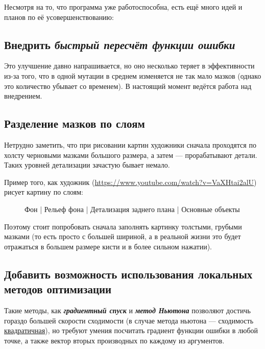 Несмотря на то, что программа уже работоспособна, есть ещё много идей и планов по её усовершенствованию:


 \subsection{Внедрить \textit{быстрый пересчёт функции ошибки}}
Это улучшение давно напрашивается,
но оно несколько теряет в эффективности из-за того, что в одной мутации в среднем изменяется
не так мало мазков (однако это количество убывает со временем).
В настоящий момент ведётся работа над внедрением.

\subsection{Разделение мазков по слоям}
 Нетрудно заметить, что при рисовании картин художники сначала проходятся по холсту черновыми мазками большого размера, а затем — прорабатывают детали.
 Таких уровней детализации зачастую бывает немало.

 Пример того, как художник (\href{https://www.youtube.com/watch?v=VaXHtai2alU}{https://www.youtube.com/watch?v=VaXHtai2alU}) рисует картину по слоям:

\begin{figure}[h!]
    \centering
    \caption{ Фон | Рельеф фона | Детализация заднего плана | Основные объекты}
    \label{fig:layered_painting}
\end{figure}
\FloatBarrier


Поэтому стоит попробовать сначала заполнять картинку толстыми, грубыми мазками
(то есть просто с большей шириной, а в реальной жизни это будет отражаться в большем размере кисти и в более сильном нажатии).

\subsection{Добавить возможность использования локальных методов оптимизации}
Такие методы, как \textbf\textit{{градиентный спуск}} и \textbf\textit{{метод Ньютона}} позволяют достичь гораздо большей скорости сходимости
(в случае метода ньютона — сходимость \href{http://w.ict.nsc.ru/books/textbooks/akhmerov/mo_unicode/4.html}{квадратичная}),
но требуют умения посчитать градиент функции ошибки в любой точке, а также вектор вторых производных по каждому из аргументов.

